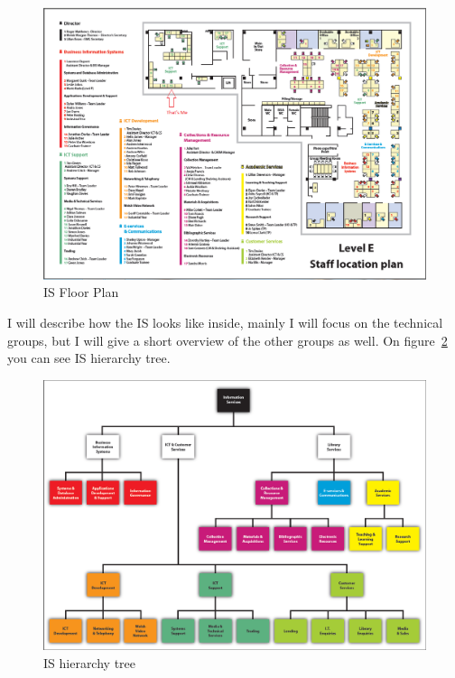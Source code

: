 \documentclass[10pt,a4paper,headinclude=true]{report}
\begin{document}
\begin{figure}[H]
\centering
\centerline{\includegraphics[scale=0.55]{./isfloorplan}}
\caption{IS Floor Plan \cite{IS_Plan}}
\label{fig:isfloorplan}
\end{figure}

I will describe how the IS looks like inside, mainly I will focus on the technical groups, but I will give a short overview of the other groups as well. On figure~\ref{fig:i-s-hierarchy-tree-march-2012} you can see IS hierarchy tree.

\begin{figure}[H]
\centering
\centerline{\includegraphics[scale=0.55]{./i-s-hierarchy-tree-march-2012}}
\caption{IS hierarchy tree}
\label{fig:i-s-hierarchy-tree-march-2012}
\end{figure}
\end{document}

